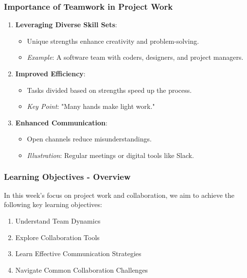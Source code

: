 \documentclass[aspectratio=169]{beamer}
\begin{document}
\begin{frame}[fragile]
    \frametitle{Importance of Teamwork in Project Work}
    \begin{enumerate}
        \item \textbf{Leveraging Diverse Skill Sets}:
        \begin{itemize}
            \item Unique strengths enhance creativity and problem-solving.
            \item \textit{Example}: A software team with coders, designers, and project managers.
        \end{itemize}
        
        \item \textbf{Improved Efficiency}:
        \begin{itemize}
            \item Tasks divided based on strengths speed up the process.
            \item \textit{Key Point}: "Many hands make light work."
        \end{itemize}
        
        \item \textbf{Enhanced Communication}:
        \begin{itemize}
            \item Open channels reduce misunderstandings.
            \item \textit{Illustration}: Regular meetings or digital tools like Slack.
        \end{itemize}
    \end{enumerate}
\end{frame}

\begin{frame}[fragile]
    \frametitle{Learning Objectives - Overview}
    In this week’s focus on project work and collaboration, we aim to achieve the following key learning objectives:
    \begin{enumerate}
        \item Understand Team Dynamics
        \item Explore Collaboration Tools
        \item Learn Effective Communication Strategies
        \item Navigate Common Collaboration Challenges
    \end{enumerate}
\end{frame}
\end{document}
